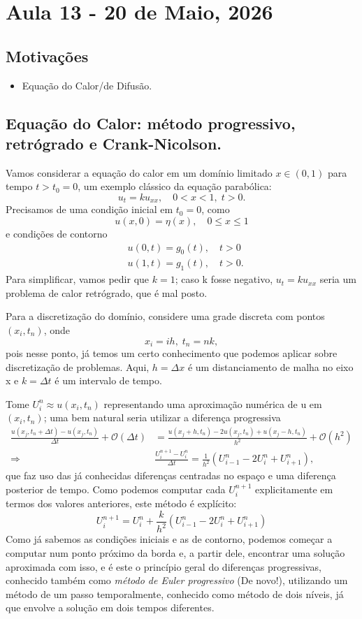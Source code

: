 \documentclass[../differential_methods.tex]{subfiles}
\begin{document}
\section{Aula 13 - 20 de Maio, 2026}
\subsection{Motivações}
\begin{itemize}
	\item Equação do Calor/de Difusão.
\end{itemize}
\subsection{Equação do Calor: método progressivo, retrógrado e Crank-Nicolson.}
Vamos considerar a equação do calor em um domínio limitado \(x\in (0, 1)\) para tempo \(t > t_{0} = 0\), um exemplo clássico da equação parabólica:
\[
	u_{t} = ku_{xx}, \quad 0<x<1,\; t>0.
\]
Precisamos de uma condição inicial em \(t_{0}=0\), como
\[
	u(x, 0) = \eta (x),\quad 0\leq x\leq 1
\]
e condições de contorno
\begin{align*}
	 & u(0, t) = g_{0}(t),\quad t>0   \\
	 & u(1, t) = g_{1}(t), \quad t>0.
\end{align*}
Para simplificar, vamos pedir que \(k=1\); caso k fosse negativo, \(u_{t}=ku_{xx}\) seria um problema de calor retrógrado, que é mal posto.

Para a discretização do domínio, considere uma grade discreta com pontos \((x_{i}, t_{n})\), onde
\[
	x_{i}=ih,\; t_{n}=nk,
\]
pois nesse ponto, já temos um certo conhecimento que podemos aplicar sobre discretização de problemas. Aqui, \(h=\Delta x\) é um distanciamento de malha no eixo x e \(k=\Delta t\) é um intervalo de tempo.

Tome \(U_{i}^{n}\approx u(x_{i}, t_{n})\) representando uma aproximação numérica de u em \((x_{i}, t_{n})\); uma bem natural seria utilizar a diferença progressiva
\begin{align*}
	\frac{u(x_{j}, t_{n}+\Delta t)-u(x_{j}, t_{n})}{\Delta t}+ \mathcal{O}(\Delta t) & = \frac{u(x_{j}+h, t_{n})-2u(x_{j}, t_{n}) + u(x_{j} -h, t_{n})}{h^{2}}+\mathcal{O}(h^{2})    \\
	\Rightarrow                                                                      & \frac{U_{i}^{n+1}-U_{i}^{n}}{\Delta t} = \frac{1}{h^{2}}(U_{i-1}^{n}-2U_{i}^{n}+U_{i+1}^{n}),
\end{align*}
que faz uso das já conhecidas diferenças centradas no espaço e uma diferença posterior de tempo. Como podemos computar cada \(U_{i}^{n+1}\) explicitamente em termos dos valores anteriores, este método é explícito:
\[
	\boxed{U_{i}^{n+1} = U_{i}^{n} + \frac{k}{h^{2}}(U_{i-1}^{n}-2U_{i}^{n}+U_{i+1}^{n})}
\]
Como já sabemos as condições iniciais e as de contorno, podemos começar a computar num ponto próximo da borda e, a partir dele, encontrar uma solução aproximada com isso, e é este o princípio geral do diferenças progressivas, conhecido também como \textit{método de Euler progressivo} (De novo!), utilizando um método de um passo temporalmente, conhecido como método de dois níveis, já que envolve a solução em dois tempos diferentes.
\end{document}

